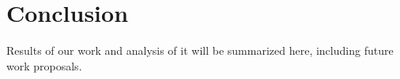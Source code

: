 \chapter*{Conclusion}  %





Results of our work and analysis of it will be summarized here, including future work proposals.